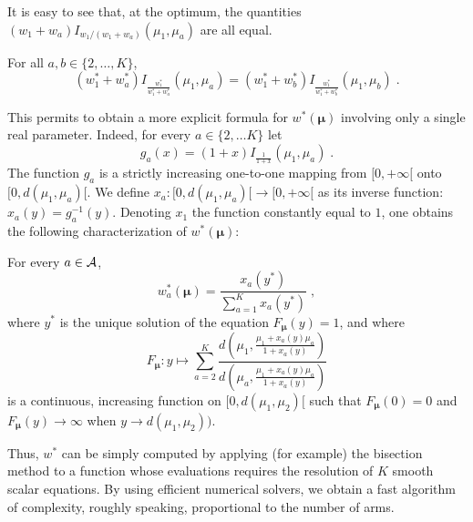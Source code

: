 \documentclass{colt2016} %
\begin{document}
It is easy to see that, at the optimum, the quantities $(w_1 + w_a)I_{{w_1}/({w_1+w_a})}(\mu_1,\mu_a)$ are all equal.
\begin{lemma}\label{lem:allEqual}
For all $a,b\in\{2,\dots,K\}$, 
\[ (w^*_1 + w^*_a)I_{\frac{w^*_1}{w^*_1+w^*_a}}(\mu_1,\mu_a) =  (w^*_1 + w^*_b)I_{\frac{w^*_1}{w^*_1+w^*_b}}(\mu_1,\mu_b)\;. \]
\end{lemma}
This permits to obtain a more explicit formula for $w^*(\bm \mu)$ involving only a single real parameter. Indeed, for every $a \in\{ 2, \dots K\}$ let 
 \begin{equation}g_a(x)  =   (1+x) I_{\frac{1}{1+x}}(\mu_1,\mu_a) \;.%
\label{def:InverseFunction}\end{equation}
The function $g_a$ is a strictly increasing one-to-one mapping from $[0,+\infty[$ onto $[0,d(\mu_1,\mu_a)[$. We define $x_a: [0,d(\mu_1,\mu_a)[ \to [0, + \infty[$ as its inverse function: $x_a(y)=g_a^{-1}(y)$.
Denoting $x_1$ the function constantly equal to $1$, one obtains the following characterization of $w^*(\bm\mu)$:
\begin{theorem}\label{thm:ExplicitForm} For every $a\in\mathcal{A}$, 
\begin{equation}\label{eq:nuofx}
w^*_a(\bm \mu) = \frac{x_a(y^*)}{\sum_{a=1}^Kx_a(y^*)}\;,\end{equation}
where $y^*$ is the unique solution of the equation $F_{\bm\mu}(y)=1$, and where
\begin{equation}\label{eq:relation} F_{\bm\mu}:y\mapsto \sum_{a=2}^K \frac{d\left(\mu_1,\frac{\mu_1 + x_a(y)\mu_a}{1+x_a(y)}\right)}{d\left(\mu_a,\frac{\mu_1 + x_a(y)\mu_a}{1+x_a(y)}\right)} \end{equation}
is a continuous, increasing function on $[0,d(\mu_1,\mu_2)[$ such that $F_{\bm\mu}(0)=0$ and $F_{\bm\mu}(y)\to \infty$ when $y\to d(\mu_1,\mu_2))$.
\end{theorem}
Thus, $w^*$ can be simply computed by applying (for example) the bisection method to a function whose evaluations requires the resolution of $K$ smooth scalar equations. By using efficient numerical solvers, we obtain a fast algorithm of complexity, roughly speaking, proportional to the number of arms. 
\end{document}
